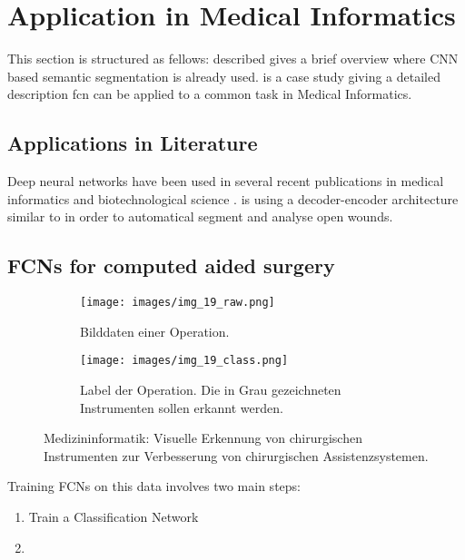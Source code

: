 \section{Application in Medical Informatics}\label{sec:application}




This section is structured as fellows:  described gives a brief overview where \gls{CNN} based semantic segmentation is already used.  is a case study giving a detailed description fcn can be applied to a common task in Medical Informatics.

\subsection{Applications in Literature} \label{sec:otherapp}

Deep neural networks have been used in several recent publications in medical informatics and biotechnological science \cite{Brain_Tumor} \cite{Colon} \cite{Micro1} \cite{Wound} \cite{Micro2}. \cite{Wound} is using a decoder-encoder architecture similar to \cite{segnet} in order to automatical segment and analyse open wounds. 


\subsection{FCNs for computed aided surgery} \label{sec:surgery}

\begin{figure*}
    \begin{subfigure}[t]{0.475\columnwidth}
    \centering
        \texttt{[image: images/img\_19\_raw.png]}
        \caption{Bilddaten einer Operation.}
        \label{fig:sfig1}
    \end{subfigure}\hspace{0.05\textwidth}
    \begin{subfigure}[t]{0.475\columnwidth}
        \centering
        \texttt{[image: images/img\_19\_class.png]}
        \caption{Label der Operation. Die in Grau gezeichneten Instrumenten
                 sollen erkannt werden.}
        \label{fig:sfig2}
    \end{subfigure}
    \caption{Medizininformatik: Visuelle Erkennung von chirurgischen
             Instrumenten zur Verbesserung von chirurgischen
             Assistenzsystemen.}
    \label{fig:medInfo}
\end{figure*}

Training FCNs on this data involves two main steps:

\begin{enumerate}
\item Train a Classification Network
\item 
\end{enumerate}


